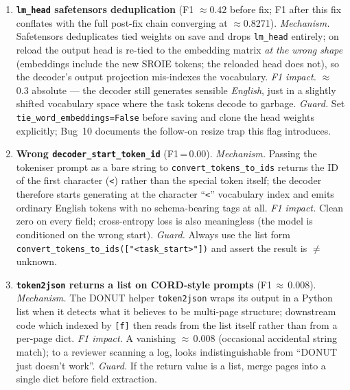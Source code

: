 \documentclass[conference]{IEEEtran}
\begin{document}
\begin{enumerate}

\item \textbf{\texttt{lm\_head} safetensors deduplication}
  (F1 $\approx 0.42$ before fix; F1 after this fix conflates with the
  full post-fix chain converging at $\approx$0.8271).
  \textit{Mechanism.} Safetensors deduplicates tied weights on save
  and drops \texttt{lm\_head} entirely; on reload the output head
  is re-tied to the embedding matrix \emph{at the wrong shape}
  (embeddings include the new SROIE tokens; the reloaded head does
  not), so the decoder's output projection mis-indexes the vocabulary.
  \textit{F1 impact.} $\approx$\,0.3 absolute --- the decoder still
  generates sensible \emph{English}, just in a slightly shifted
  vocabulary space where the task tokens decode to garbage.
  \textit{Guard.} Set \texttt{tie\_word\_embeddings=False} before
  saving and clone the head weights explicitly; Bug~10 documents
  the follow-on resize trap this flag introduces.

\item \textbf{Wrong \texttt{decoder\_start\_token\_id}} (F1\,=\,0.00).
  \textit{Mechanism.} Passing the tokeniser prompt as a bare string
  to \texttt{convert\_tokens\_to\_ids} returns the ID of the first
  character (\texttt{<}) rather than the special token itself; the
  decoder therefore starts generating at the character ``\texttt{<}''
  vocabulary index and emits ordinary English tokens with no
  schema-bearing tags at all.  \textit{F1 impact.} Clean zero on
  every field; cross-entropy loss is also meaningless (the model is
  conditioned on the wrong start).  \textit{Guard.} Always use the
  list form \texttt{convert\_tokens\_to\_ids(["<task\_start>"])}
  and assert the result is $\neq$ unknown.

\item \textbf{\texttt{token2json} returns a list on CORD-style prompts}
  (F1\,$\approx$\,0.008).
  \textit{Mechanism.} The DONUT helper \texttt{token2json} wraps its
  output in a Python list when it detects what it believes to be
  multi-page structure; downstream code which indexed by \texttt{[f]}
  then reads from the list itself rather than from a per-page dict.
  \textit{F1 impact.} A vanishing $\approx$\,0.008 (occasional
  accidental string match); to a reviewer scanning a log, looks
  indistinguishable from ``DONUT just doesn't work''.
  \textit{Guard.} If the return value is a list, merge pages into a
  single dict before field extraction.


\end{enumerate}
\end{document}

